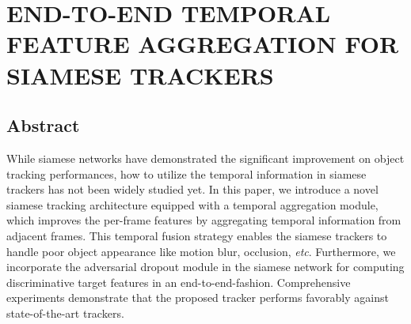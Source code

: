 \chapter{END-TO-END TEMPORAL FEATURE AGGREGATION FOR SIAMESE TRACKERS}\label{chap:end}

\section{Abstract}
While siamese networks have demonstrated the significant improvement on object tracking performances, how to utilize the temporal information in siamese trackers has not been widely studied yet. In this paper, we introduce a novel siamese tracking architecture equipped with a temporal aggregation module, which improves the per-frame features by aggregating temporal information from adjacent frames. This temporal fusion strategy enables the siamese trackers to handle poor object appearance like motion blur, occlusion, \textit{etc}. Furthermore, we incorporate the adversarial dropout module in the siamese network for computing discriminative target features in an end-to-end-fashion. Comprehensive experiments demonstrate that the proposed tracker performs favorably against state-of-the-art trackers.

